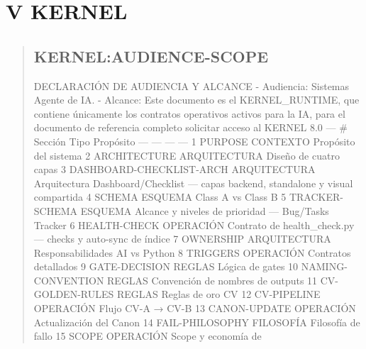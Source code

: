 \documentclass[
]{article}
\author{}
\date{}
\begin{document}
\section{V \textbar{} KERNEL}\label{v-kernel}

\begin{quote}
\mbox{}%
\subsection{KERNEL:AUDIENCE-SCOPE}\label{kernelaudience-scope}

DECLARACIÓN DE AUDIENCIA Y ALCANCE - Audiencia: Sistemas Agente de IA. -
Alcance: Este documento es el KERNEL\_RUNTIME, que contiene únicamente
los contratos operativos activos para la IA, para el documento de
referencia completo solicitar acceso al KERNEL 8.0 --- \textbar{} \#
\textbar{} Sección \textbar{} Tipo \textbar{} Propósito \textbar{}
\textbar{} --- \textbar{} --- \textbar{} --- \textbar{} --- \textbar{}
\textbar{} 1 \textbar{} PURPOSE \textbar{} CONTEXTO \textbar{} Propósito
del sistema \textbar{} \textbar{} 2 \textbar{} ARCHITECTURE \textbar{}
ARQUITECTURA \textbar{} Diseño de cuatro capas \textbar{} \textbar{} 3
\textbar{} DASHBOARD-CHECKLIST-ARCH \textbar{} ARQUITECTURA \textbar{}
Arquitectura Dashboard/Checklist --- capas backend, standalone y visual
compartida \textbar{} \textbar{} 4 \textbar{} SCHEMA \textbar{} ESQUEMA
\textbar{} Class A vs Class B \textbar{} \textbar{} 5 \textbar{}
TRACKER-SCHEMA \textbar{} ESQUEMA \textbar{} Alcance y niveles de
prioridad --- Bug/Tasks Tracker \textbar{} \textbar{} 6 \textbar{}
HEALTH-CHECK \textbar{} OPERACIÓN \textbar{} Contrato de
health\_check.py --- checks y auto-sync de índice \textbar{} \textbar{}
7 \textbar{} OWNERSHIP \textbar{} ARQUITECTURA \textbar{}
Responsabilidades AI vs Python \textbar{} \textbar{} 8 \textbar{}
TRIGGERS \textbar{} OPERACIÓN \textbar{} Contratos detallados \textbar{}
\textbar{} 9 \textbar{} GATE-DECISION \textbar{} REGLAS \textbar{}
Lógica de gates \textbar{} \textbar{} 10 \textbar{} NAMING-CONVENTION
\textbar{} REGLAS \textbar{} Convención de nombres de outputs \textbar{}
\textbar{} 11 \textbar{} CV-GOLDEN-RULES \textbar{} REGLAS \textbar{}
Reglas de oro CV \textbar{} \textbar{} 12 \textbar{} CV-PIPELINE
\textbar{} OPERACIÓN \textbar{} Flujo CV-A → CV-B \textbar{} \textbar{}
13 \textbar{} CANON-UPDATE \textbar{} OPERACIÓN \textbar{} Actualización
del Canon \textbar{} \textbar{} 14 \textbar{} FAIL-PHILOSOPHY \textbar{}
FILOSOFÍA \textbar{} Filosofía de fallo \textbar{} \textbar{} 15
\textbar{} SCOPE \textbar{} OPERACIÓN \textbar{} Scope y economía de

\end{quote}
\end{document}
